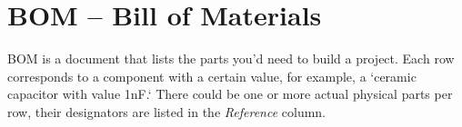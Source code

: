 \documentclass[a4paper,12pt]{article}
\begin{document}
\pagebreak

\section{BOM – Bill of Materials}

BOM is a document that lists the parts you'd need to build a
project. Each row corresponds to a component with a certain
value, for example, a `ceramic capacitor with value 1nF.`
There could be one or more actual physical parts per
row, their designators are listed in the \textit{Reference}
column.



\end{document}
